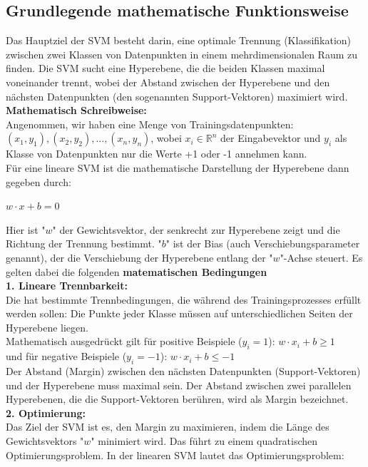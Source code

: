 \documentclass[12pt]{article}
\begin{document}
\subsection{Grundlegende mathematische Funktionsweise}
Das Hauptziel der SVM besteht darin, eine optimale Trennung (Klassifikation) zwischen zwei Klassen von Datenpunkten in einem mehrdimensionalen Raum zu finden. Die SVM sucht eine Hyperebene, die die beiden Klassen maximal voneinander trennt, wobei der Abstand zwischen der Hyperebene und den nächsten Datenpunkten (den sogenannten Support-Vektoren) maximiert wird.
\\
\textbf{Mathematisch Schreibweise:}
\\Angenommen, wir haben eine Menge von Trainingsdatenpunkten: ${(x_1, y_1), (x_2, y_2),... , (x_n, y_n)}$, wobei $x_i \in \mathbb{R}^n$ der Eingabevektor und $y_i$ als Klasse von Datenpunkten nur die Werte +1 oder -1 annehmen kann.\\
Für eine lineare SVM ist die mathematische Darstellung der Hyperebene dann gegeben durch:
\begin{center}
\begin{large} \textbf{$w \cdot x + b = 0$} \end{large} 
\end{center}
Hier ist "$w$" der Gewichtsvektor, der senkrecht zur Hyperebene zeigt und die Richtung der Trennung bestimmt. "$b$" ist der Bias (auch Verschiebungsparameter genannt), der die Verschiebung der Hyperebene entlang der "$w$"-Achse steuert. Es gelten dabei die folgenden \textbf{matematischen Bedingungen}\\
\textbf{1. Lineare Trennbarkeit:}\\
Die {\color{blue}{SVM}}  hat bestimmte Trennbedingungen, die während des Trainingsprozesses erfüllt werden sollen:
Die Punkte jeder Klasse müssen auf unterschiedlichen Seiten der Hyperebene liegen.\\
Mathematisch ausgedrückt gilt für positive Beispiele ($y_i = 1$): $w \cdot x_i + b \geq 1$\\
und für negative Beispiele ($y_i = -1$): $w \cdot x_i + b \leq -1$\\
Der Abstand (Margin) zwischen den nächsten Datenpunkten (Support-Vektoren) und der Hyperebene muss maximal sein. Der Abstand zwischen zwei parallelen Hyperebenen, die die Support-Vektoren berühren, wird als Margin bezeichnet.\\
\textbf{2. Optimierung:}\\Das Ziel der SVM ist es, den Margin zu maximieren, indem die Länge des Gewichtsvektors "$w$" minimiert wird. Das führt zu einem quadratischen Optimierungsproblem. In der linearen SVM lautet das Optimierungsproblem:
\end{document}
